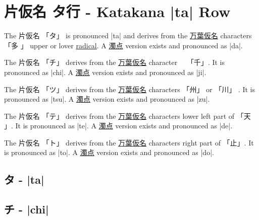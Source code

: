\section{片仮名  タ行 - Katakana |ta| Row}  \label{sec:KatakanaTaRow}


 The  片仮名 {「タ」} is pronounced  |ta| and  derives from the
\hyperref[sec:Manyogana]{万葉仮名} characters {「多 」} upper or lover
\hyperref[sec:Radical]{radical}.  A \hyperref[sec:Dakuten]{濁点} version exists
and pronounced as |da|.

 The 片仮名 {「チ」} derives from the
\hyperref[sec:Manyogana]{万葉仮名} character　 {「千」}.  It is pronounced as
|chi|.  A \hyperref[sec:Dakuten]{濁点} version exists and pronounced as |ji|.

 The 片仮名 {「ツ」} derives from the
\hyperref[sec:Manyogana]{万葉仮名} characters {「州」} or {「川」} .  It is
pronounced as |tsu|.  A \hyperref[sec:Dakuten]{濁点} version exists and
pronounced as |zu|. 

 The 片仮名 {「テ」} derives from the
\hyperref[sec:Manyogana]{万葉仮名} characters lower left part of {「天 」}.  It
is pronounced as |te|.  A \hyperref[sec:Dakuten]{濁点} version exists and
pronounced as |de|.  

\newpage

 The 片仮名 {「ト」} derives from the
\hyperref[sec:Manyogana]{万葉仮名} characters right part of {「止」}.  It is
pronounced as |to|.  A \hyperref[sec:Dakuten]{濁点} version exists and
pronounced as |do|.

 


\newpage

\subsection{タ - |ta|} \label{sec:KatakanaTa}


\subsection{チ - |chi|} \label{sec:KatakanaChi}

